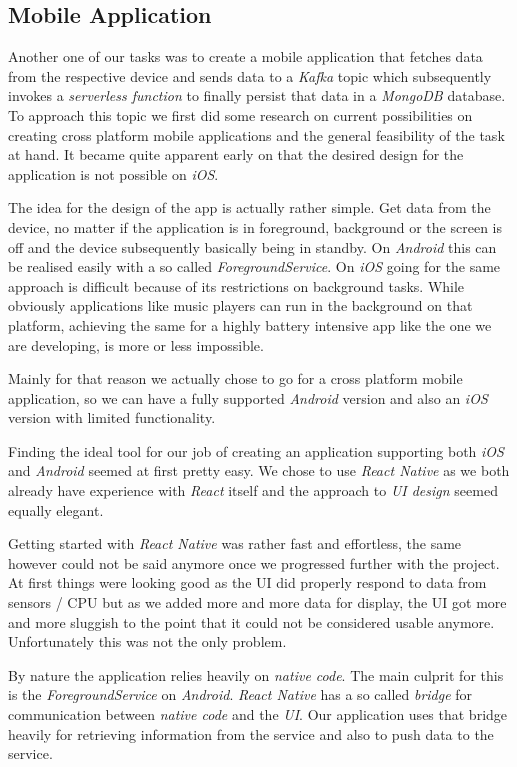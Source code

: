\subsection{Mobile Application}

Another one of our tasks was to create a mobile application that fetches data from the respective
device and sends data to a \textit{Kafka} topic which subsequently invokes a \textit{serverless
function} to finally persist that data in a \textit{MongoDB} database. To approach this topic we
first did some research on current possibilities on creating cross platform mobile applications and
the general feasibility of the task at hand. It became quite apparent early on that the desired
design for the application is not possible on \textit{iOS}.

The idea for the design of the app is actually rather simple. Get data from the device, no matter if
the application is in foreground, background or the screen is off and the device subsequently
basically being in standby. On \textit{Android} this can be realised easily with a so called
\textit{ForegroundService}. On \textit{iOS} going for the same approach is difficult because of its
restrictions on background tasks. While obviously applications like music players can run in the
background on that platform, achieving the same for a highly battery intensive app like the one we
are developing, is more or less impossible.

Mainly for that reason we actually chose to go for a cross platform mobile application, so we can
have a fully supported \textit{Android} version and also an \textit{iOS} version with limited
functionality.

Finding the ideal tool for our job of creating an application supporting both \textit{iOS} and
\textit{Android} seemed at first pretty easy. We chose to use \textit{React Native} as we both
already have experience with \textit{React} itself and the approach to \textit{UI design} seemed
equally elegant.

Getting started with \textit{React Native} was rather fast and effortless, the same however could
not be said anymore once we progressed further with the project. At first things were looking good
as the UI did properly respond to data from sensors / CPU but as we added more and more data for
display, the UI got more and more sluggish to the point that it could not be considered usable
anymore. Unfortunately this was not the only problem.

By nature the application relies heavily on \textit{native code}. The main culprit for this is the
\textit{ForegroundService} on \textit{Android}. \textit{React Native} has a so called
\textit{bridge} for communication between \textit{native code} and the \textit{UI}. Our application
uses that bridge heavily for retrieving information from the service and also to push data to the
service.

